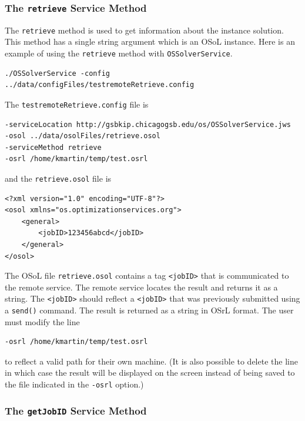 \documentclass[11pt]{article}
\renewcommand{\_}{{\char"5F}}
\renewcommand{\{}{{\char"7B}}
\renewcommand{\}}{{\char"7D}}
\renewcommand{\^}{{\char"0D}}
\renewcommand{\'}{{\char"0D}}
\begin{document}
\begin{enumerate}[Step 1:]
\subsubsection{The  {\tt retrieve} Service Method}\label{section:retrieve}

The {\tt retrieve} method is used to get information about the instance solution.  This method has a single string argument which is an OSoL instance. Here is an example of using the {\tt retrieve} method with {\tt OSSolverService}.
\begin{verbatim}
./OSSolverService -config ../data/configFiles/testremoteRetrieve.config
\end{verbatim}
The {\tt testremoteRetrieve.config} file is
\begin{verbatim}
-serviceLocation http://gsbkip.chicagogsb.edu/os/OSSolverService.jws
-osol ../data/osolFiles/retrieve.osol
-serviceMethod retrieve
-osrl /home/kmartin/temp/test.osrl
\end{verbatim}
and the {\tt retrieve.osol} file is

\begin{verbatim}
<?xml version="1.0" encoding="UTF-8"?>
<osol xmlns="os.optimizationservices.org">
    <general>
        <jobID>123456abcd</jobID>
    </general>
</osol>
\end{verbatim}

The OSoL file {\tt retrieve.osol} contains a tag {\tt <jobID>} that is communicated to 
the remote service. The remote service locates the result and returns it as a string. 
The {\tt <jobID>} should reflect a {\tt <jobID>} that was previously submitted
using a {\tt send()} command.
The result is returned as a string in OSrL format.  The user must modify the line
\begin{verbatim}
-osrl /home/kmartin/temp/test.osrl
\end{verbatim}
to reflect a valid path for their own machine.  (It is also possible to delete the line 
in which case the result will be displayed on the screen instead of being saved to the 
file indicated in the {\tt -osrl} option.)
 

\subsubsection{The  {\tt getJobID} Service Method}\label{section:getjobid}


\end{enumerate}
\end{document}
